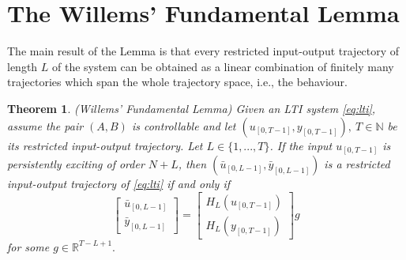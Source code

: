 \documentclass[12pt,a4paper]{report}
\newtheorem{theorem}{Theorem}
\begin{document}
\section{The Willems' Fundamental Lemma}

The main result of the Lemma is that every restricted input-output trajectory of length $L$ of the system can be obtained as a linear combination
of finitely many trajectories which span the whole trajectory space, i.e., the behaviour.

\begin{theorem} (Willems' Fundamental Lemma) Given an LTI system \eqref{eq:lti}, assume the pair $(A, B)$ is controllable and let \((u_{[0, T-1]}, y_{[0, T-1]}), \ T \in \mathbb{N}\)
be its restricted input-output trajectory. Let \( L \in \{1, ..., T\}\). If the input $u_{[0, T-1]}$ is persistently exciting of order $N + L$, then
\((\bar{u}_{[0, L-1]}, \bar{y}_{[0, L-1]})\) is a restricted input-output trajectory of \eqref{eq:lti} if and only if
\[\begin{bmatrix} \bar{u}_{[0, L-1]} \\ \bar{y}_{[0, L-1]} \end{bmatrix} = \begin{bmatrix} H_{L}(u_{[0, T-1]}) \\ H_{L}(y_{[0, T-1]})\end{bmatrix}g \]
for some $g \in \mathbb{R}^{T-L+1}.$

\label{thm:lemma}
\end{theorem}
\end{document}
